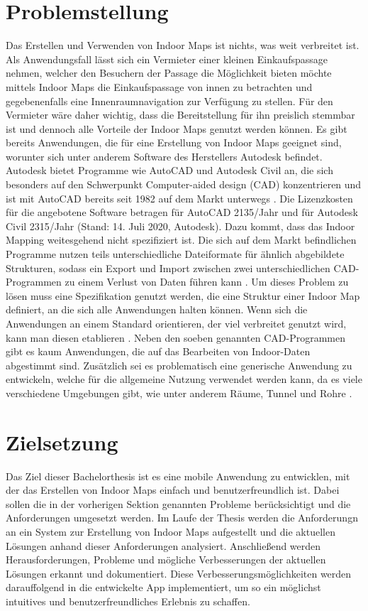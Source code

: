 \section{Problemstellung}
\label{sec:problems}
Das Erstellen und Verwenden von Indoor Maps ist nichts, was weit verbreitet ist.
Als Anwendungsfall lässt sich ein Vermieter einer kleinen Einkaufspassage nehmen, welcher den Besuchern der Passage die Möglichkeit bieten möchte mittels Indoor Maps die Einkaufspassage von innen zu betrachten und gegebenenfalls eine Innenraumnavigation zur Verfügung zu stellen.
Für den Vermieter wäre daher wichtig, dass die Bereitstellung für ihn preislich stemmbar ist und dennoch alle Vorteile der Indoor Maps genutzt werden können.\pbreak%
%
Es gibt bereits Anwendungen, die für eine Erstellung von Indoor Maps geeignet sind, worunter sich unter anderem Software des Herstellers Autodesk befindet.
Autodesk bietet Programme wie AutoCAD und Autodesk Civil an, die sich besonders auf den Schwerpunkt Computer-aided design (CAD) konzentrieren und ist mit AutoCAD bereits seit 1982 auf dem Markt unterwegs \parencite{HUR2008}.
Die Lizenzkosten für die angebotene Software betragen für AutoCAD \SI{2135}{\eur}/Jahr und für Autodesk Civil \SI{2315}{\eur}/Jahr (Stand: 14. Juli 2020, Autodesk).\pbreak%
%
Dazu kommt, dass das Indoor Mapping weitesgehend nicht spezifiziert ist.
Die sich auf dem Markt befindlichen Programme nutzen teils unterschiedliche Dateiformate für ähnlich abgebildete Strukturen, sodass ein Export und Import zwischen zwei unterschiedlichen CAD-Programmen zu einem Verlust von Daten führen kann \parencite[65]{GEL2019, ZLA2013}.
Um dieses Problem zu lösen muss eine Spezifikation genutzt werden, die eine Struktur einer Indoor Map definiert, an die sich alle Anwendungen halten können.
Wenn sich die Anwendungen an einem Standard orientieren, der viel verbreitet genutzt wird, kann man diesen etablieren \parencite{GEL2019}.\pbreak%
%
Neben den soeben genannten CAD-Programmen gibt es kaum Anwendungen, die auf das Bearbeiten von Indoor-Daten abgestimmt sind.
Zusätzlich sei es problematisch eine generische Anwendung zu entwickeln, welche für die allgemeine Nutzung verwendet werden kann, da es viele verschiedene Umgebungen gibt, wie unter anderem Räume, Tunnel und Rohre \parencite[65]{ZLA2013}.

\section{Zielsetzung}
Das Ziel dieser Bachelorthesis ist es eine mobile Anwendung zu entwicklen, mit der das Erstellen von Indoor Maps einfach und benutzerfreundlich ist.
Dabei sollen die in der vorherigen Sektion genannten Probleme berücksichtigt und die Anforderungen umgesetzt werden.
Im Laufe der Thesis werden die Anforderungn an ein System zur Erstellung von Indoor Maps aufgestellt und die aktuellen Lösungen anhand dieser Anforderungen analysiert.
Anschließend werden Herausforderungen, Probleme und mögliche Verbesserungen der aktuellen Lösungen erkannt und dokumentiert.
Diese Verbesserungsmöglichkeiten werden darauffolgend in die entwickelte App implementiert, um so ein möglichst intuitives und benutzerfreundliches Erlebnis zu schaffen.
